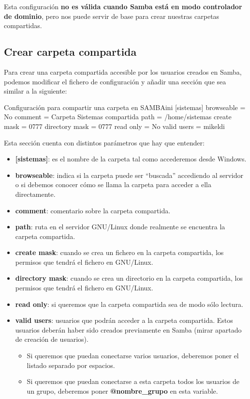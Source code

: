
Esta configuración \textbf{no es válida cuando Samba está en modo controlador de dominio}, pero nos puede servir de base para crear nuestras carpetas compartidas.

\subsection{Crear carpeta compartida}
Para crear una carpeta compartida accesible por los usuarios creados en Samba, podemos modificar el fichero de configuración y añadir una sección que sea similar a la siguiente:

\begin{mycode}{Configuración para compartir una carpeta en SAMBA}{ini}{}
[sistemas]
    browseable = No
    comment = Carpeta Sistemas compartida
    path = /home/sistemas
    create mask = 0777
    directory mask = 0777
    read only = No
    valid users = mikeldi
\end{mycode}

Esta sección cuenta con distintos parámetros que hay que entender:
\begin{itemize}
    \item \textbf{[sistemas]}: es el nombre de la carpeta tal como accederemos desde Windows.
    \item \textbf{browseable}: indica si la carpeta puede ser “buscada” accediendo al servidor o si debemos conocer cómo se llama la carpeta para acceder a ella directamente.
    \item \textbf{comment}: comentario sobre la carpeta compartida.
    \item \textbf{path}: ruta en el servidor GNU/Linux donde realmente se encuentra la carpeta compartida.
    \item \textbf{create mask}: cuando se crea un fichero en la carpeta compartida, los permisos que tendrá el fichero en GNU/Linux.
    \item \textbf{directory mask}: cuando se crea un directorio en la carpeta compartida, los permisos que tendrá el fichero  en GNU/Linux.
    \item \textbf{read only}: si queremos que la carpeta compartida sea de modo sólo lectura.
    \item \textbf{valid users}: usuarios que podrán acceder a la carpeta compartida. Estos usuarios deberán haber sido creados previamente en Samba (mirar apartado de creación de usuarios).
    \begin{itemize}
        \item Si queremos que puedan conectarse varios usuarios, deberemos poner el listado separado por espacios.
        \item Si queremos que puedan conectarse a esta carpeta todos los usuarios de un grupo, deberemos poner \textbf{@nombre\_grupo} en esta variable.
    \end{itemize}
\end{itemize}

